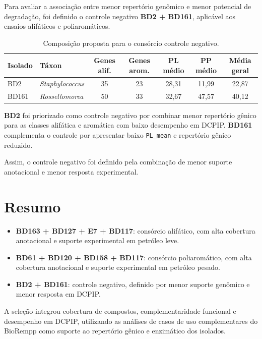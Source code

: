 \documentclass[12pt,a4paper]{article}
\begin{document}
Para avaliar a associação entre menor repertório genômico e menor potencial de degradação, foi definido o controle negativo \textbf{BD2 + BD161}, aplicável aos ensaios alifáticos e poliaromáticos.

\begin{table}[H]
\centering
\small
\caption{Composição proposta para o consórcio controle negativo.}
\begin{tabular}{llccccc}
\toprule
\textbf{Isolado} & \textbf{Táxon} & \textbf{Genes alif.} & \textbf{Genes arom.} & \textbf{PL médio} & \textbf{PP médio} & \textbf{Média geral} \\
\midrule
BD2 & \textit{Staphylococcus} & 35 & 23 & 28,31 & 11,99 & 22,87 \\
BD161 & \textit{Rossellomorea} & 50 & 33 & 32,67 & 47,57 & 40,12 \\
\bottomrule
\end{tabular}
\normalsize
\end{table}

\textbf{BD2} foi priorizado como controle negativo por combinar menor repertório gênico para as classes alifática e aromática com baixo desempenho em DCPIP. \textbf{BD161} complementa o controle por apresentar baixo \texttt{PL\_mean} e repertório gênico reduzido.

Assim, o controle negativo foi definido pela combinação de menor suporte anotacional e menor resposta experimental.

\section{Resumo}


\begin{itemize}
    \item \textbf{BD163 + BD127 + E7 + BD117}: consórcio alifático, com alta cobertura anotacional e suporte experimental em petróleo leve.
    \item \textbf{BD61 + BD120 + BD158 + BD117}: consórcio poliaromático, com alta cobertura anotacional e suporte experimental em petróleo pesado.
    \item \textbf{BD2 + BD161}: controle negativo, definido por menor suporte genômico e menor resposta em DCPIP.
\end{itemize}

A seleção integrou cobertura de compostos, complementaridade funcional e desempenho em DCPIP, utilizando as análises de casos de uso complementares do BioRempp como suporte ao repertório gênico e enzimático dos isolados.
\end{document}
